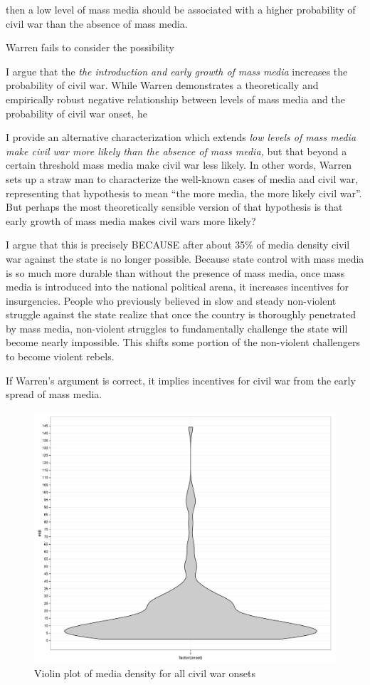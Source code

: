 \documentclass[11pt,article,oneside]{memoir}
\makeatletter
\def\maxwidth{\ifdim\Gin@nat@width>\linewidth\linewidth
\else\Gin@nat@width\fi}
\let\Oldincludegraphics\includegraphics
\renewcommand{\includegraphics}[1]{\Oldincludegraphics[width=\maxwidth]{#1}}
\makeatother
\begin{document}
then a low level of mass media should be associated with a higher
probability of civil war than the absence of mass media.

Warren fails to consider the possibility

I argue that the \emph{the introduction and early growth of mass media}
increases the probability of civil war. While Warren demonstrates a
theoretically and empirically robust negative relationship between
levels of mass media and the probability of civil war onset, he

I provide an alternative characterization which extends \emph{low levels
of mass media make civil war more likely than the absence of mass
media,} but that beyond a certain threshold mass media make civil war
less likely. In other words, Warren sets up a straw man to characterize
the well-known cases of media and civil war, representing that
hypothesis to mean ``the more media, the more likely civil war''. But
perhaps the most theoretically sensible version of that hypothesis is
that early growth of mass media makes civil wars more likely?

I argue that this is precisely BECAUSE after about 35\% of media density
civil war against the state is no longer possible. Because state control
with mass media is so much more durable than without the presence of
mass media, once mass media is introduced into the national political
arena, it increases incentives for insurgencies. People who previously
believed in slow and steady non-violent struggle against the state
realize that once the country is thoroughly penetrated by mass media,
non-violent struggles to fundamentally challenge the state will become
nearly impossible. This shifts some portion of the non-violent
challengers to become violent rebels.

If Warren's argument is correct, it implies incentives for civil war
from the early spread of mass media.

\begin{figure}[htbp]
\centering
\includegraphics{figure/violinplot.pdf}
\caption{Violin plot of media density for all civil war onsets}
\end{figure}
\end{document}
